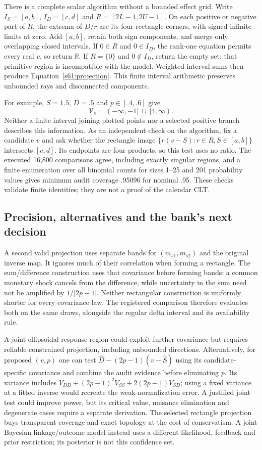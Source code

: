 There is a complete scalar algorithm without a bounded effect grid.
Write $I_S=[a,b]$, $I_D=[c,d]$ and
$R=[2L-1,2U-1]$. On each positive or negative part of $R$,
the extrema of $D/r$ are its four rectangle corners, with signed infinite
limits at zero. Add $[a,b]$, retain both sign components, and merge only
overlapping closed intervals. If $0\in R$ and $0\in I_D$, the rank-one
equation permits every real $v$, so return $\mathbb R$. If $R=\{0\}$
and $0\notin I_D$, return the empty set: that primitive region is
incompatible with the model. Weighted interval sums then produce
Equation~\eqref{s61:projection}. This finite interval arithmetic preserves
unbounded rays and disconnected components.

For example, $S=1.5$, $D=.5$ and $p\in[.4,.6]$ give
\[
 \mathcal V_s=(-\infty,-1]\ \cup\ [4,\infty).
\]
Neither a finite interval joining plotted points nor a selected positive
branch describes this information. As an independent check on the algorithm,
fix a candidate $v$ and ask whether the rectangle image
$\{r(v-S):r\in R,S\in[a,b]\}$ intersects $[c,d]$.
Its endpoints are four products, so this test uses no ratio. The executed
16,800 comparisons agree, including exactly singular regions, and a finite
enumeration over all binomial counts for sizes 1--25 and 201 probability
values gives minimum audit coverage .95096 for nominal .95. These checks
validate finite identities; they are not a proof of the calendar CLT.

\subsection{Precision, alternatives and the bank's next decision}
A second valid projection uses separate bands for $(m_{s1},m_{s2})$ and
the original inverse map. It ignores much of their correlation when forming
a rectangle. The sum/difference construction uses that covariance before
forming bands: a common monetary shock cancels from the difference, while
uncertainty in the sum need not be amplified by $1/|2p-1|$.
Neither rectangular construction is uniformly shorter for every covariance
law. The registered comparison therefore evaluates both on the same draws,
alongside the regular delta interval and its availability rule.

A joint ellipsoidal response region could exploit further covariance but
requires reliable constrained projection, including unbounded directions.
Alternatively, for proposed $(v,p)$ one can test
$\widehat D-(2p-1)(v-\widehat S)$ using its candidate-specific covariance
and combine the audit evidence before eliminating $p$. Its variance includes
$V_{DD}+(2p-1)^2V_{SS}+2(2p-1)V_{SD}$; using a fixed variance at a fitted
inverse would recreate the weak-normalization error. A justified joint
test could improve power, but its critical value, nuisance elimination and
degenerate cases require a separate derivation. The selected rectangle
projection buys transparent coverage and exact topology at the cost of
conservatism. A joint Bayesian linkage/outcome model
\citep{guha2022} instead uses a different likelihood, feedback and prior
restriction; its posterior is not this confidence set.

